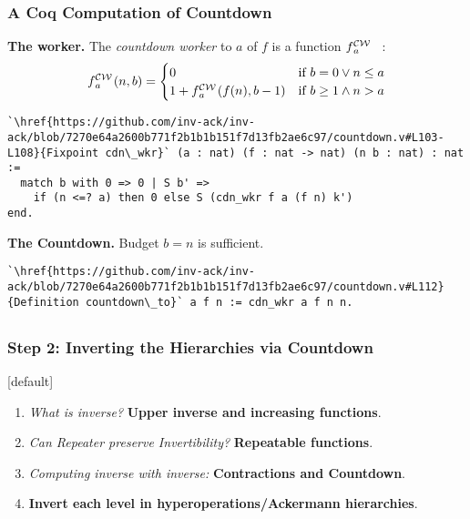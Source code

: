 \begin{frame}[fragile]
\frametitle{A Coq Computation of Countdown}

\textbf{The worker.}
The \emph{countdown worker}
to $a$ of $f$ is a function $\cdw{f}{a}$~~:
\begin{equation*}
\cdw{f}{a}(n, b) = \begin{cases}
0 & \text{if } b = 0 \vee n\le a \\ 1 +\cdw{f}{a}(f(n), b-1) & \text{if } b \ge 1 \wedge n > a
\end{cases}
\end{equation*}

\begin{lstlisting}
`\href{https://github.com/inv-ack/inv-ack/blob/7270e64a2600b771f2b1b1b151f7d13fb2ae6c97/countdown.v#L103-L108}{Fixpoint cdn\_wkr}` (a : nat) (f : nat -> nat) (n b : nat) : nat :=
  match b with 0 => 0 | S b' =>
    if (n <=? a) then 0 else S (cdn_wkr f a (f n) k')
end.
\end{lstlisting}

\bigskip

\pause 
\textbf{The Countdown.} Budget $b = n$ is sufficient.
\begin{lstlisting}
`\href{https://github.com/inv-ack/inv-ack/blob/7270e64a2600b771f2b1b1b151f7d13fb2ae6c97/countdown.v#L112}{Definition countdown\_to}` a f n := cdn_wkr a f n n.
\end{lstlisting}
\end{frame}




\subsection*{}
\begin{frame}
\frametitle{Step 2: Inverting the Hierarchies via \textbf{Countdown}}
[default]

\begin{enumerate}[\bfseries 1.]
	\itemsep 3ex
	\item<done@1->
	\emph{What is inverse?} \textbf{Upper inverse and increasing functions}.
	
	\item<done@1->
	\emph{Can Repeater preserve Invertibility?} \textbf{Repeatable functions}.
	
	\item<done@1->
	\emph{Computing inverse with inverse:} \textbf{Contractions and Countdown}.
	
	\item<come@2->
	\textbf{Invert each level in hyperoperations/Ackermann hierarchies}.
\end{enumerate}
\end{frame}


